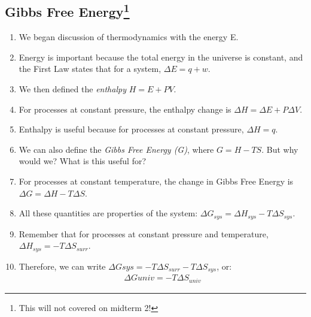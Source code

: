 \documentclass{article}  %
\begin{document}
\subsection*{Gibbs Free Energy\footnote{This will not covered on midterm 2!}}
\begin{enumerate}
    \item We began discussion of thermodynamics with the energy E.
    \item Energy is important because the total energy in the universe is constant, and the First Law states that for a system, $\Delta E = q + w$.
    \item We then defined the \emph{enthalpy} $H = E + PV$.
    \item For processes at constant pressure, the enthalpy change is $\Delta H = \Delta E + P\Delta V$.
    \item Enthalpy is useful because for processes at constant pressure, $\Delta H = q$.
    \item We can also define the \emph{Gibbs Free Energy (G)}, where $G = H - TS$. But why would we? What is this useful for?
    \item For processes at constant temperature, the change in Gibbs Free Energy is $\Delta G = \Delta H - T \Delta S$.
    \item All these quantities are properties of the system: $\Delta G_{sys} = \Delta H_{sys} - T \Delta S_{sys}$. 
    \item Remember that for processes at constant pressure and temperature, $\Delta H_{sys} = -T\Delta S_{surr}$.
    \item Therefore, we can write $\Delta G{sys} = -T\Delta S_{surr} - T\Delta S_{sys}$, or:
        \begin{equation*}
            \begin{aligned}
                \Delta G{univ} = -T\Delta S_{univ}
            \end{aligned}
        \end{equation*} 
\end{enumerate}
\end{document}
